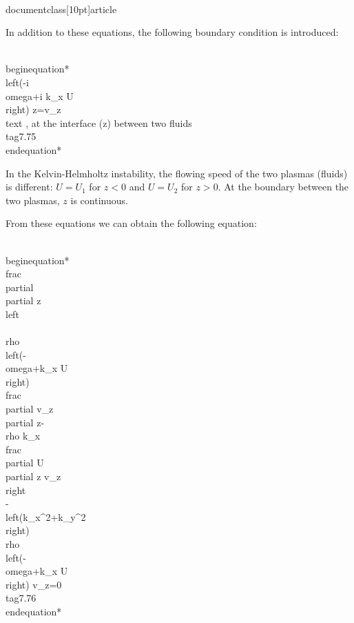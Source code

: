 \\documentclass[10pt]{article}
\begin{document}
{{{{In addition to these equations, the following boundary condition is introduced:


\\begin{equation*}
\\left(-i \\omega+i k_{x} U\\right) z=v_{z} \\text {, at the interface (z) between two fluids } \\tag{7.75}
\\end{equation*}


In the Kelvin-Helmholtz instability, the flowing speed of the two plasmas (fluids) is different: $U=U_{1}$ for $z<0$ and $U=U_{2}$ for $z>0$. At the boundary between the two plasmas, $z$ is continuous.

From these equations we can obtain the following equation:


\\begin{equation*}
\\frac{\\partial}{\\partial z}\\left\\{\\rho\\left(-\\omega+k_{x} U\\right) \\frac{\\partial v_{z}}{\\partial z}-\\rho k_{x} \\frac{\\partial U}{\\partial z} v_{z}\\right\\}-\\left(k_{x}^{2}+k_{y}^{2}\\right) \\rho\\left(-\\omega+k_{x} U\\right) v_{z}=0 \\tag{7.76}
\\end{equation*}


}}}}
\end{document}
